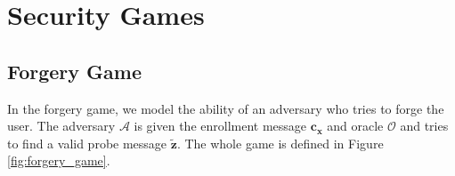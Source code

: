 
\section*{Security Games}


\subsection*{Forgery Game}
\label{sec:forgery_game}

In the forgery game, we model the ability of an adversary who tries to forge the user. The adversary $\mathcal{A}$ is given the enrollment message $\mathbf{c_x}$ and oracle $\mathcal{O}$ and tries to find a valid probe message $\mathbf{\tilde{z}}$. The whole game is defined in Figure \ref{fig:forgery_game}.

